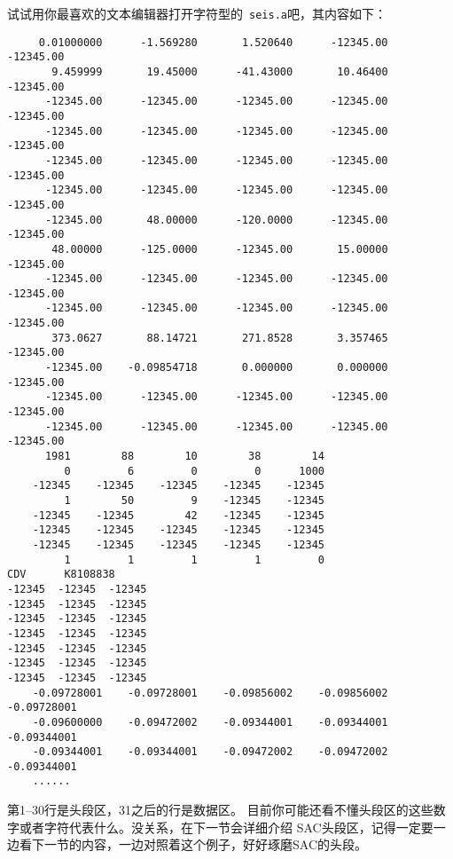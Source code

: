 试试用你最喜欢的文本编辑器打开字符型的~\verb+seis.a+吧，其内容如下：
\begin{verbatim}
     0.01000000      -1.569280       1.520640      -12345.00      -12345.00
       9.459999       19.45000      -41.43000       10.46400      -12345.00
      -12345.00      -12345.00      -12345.00      -12345.00      -12345.00
      -12345.00      -12345.00      -12345.00      -12345.00      -12345.00
      -12345.00      -12345.00      -12345.00      -12345.00      -12345.00
      -12345.00      -12345.00      -12345.00      -12345.00      -12345.00
      -12345.00       48.00000      -120.0000      -12345.00      -12345.00
       48.00000      -125.0000      -12345.00       15.00000      -12345.00
      -12345.00      -12345.00      -12345.00      -12345.00      -12345.00
      -12345.00      -12345.00      -12345.00      -12345.00      -12345.00
       373.0627       88.14721       271.8528       3.357465      -12345.00
      -12345.00    -0.09854718       0.000000       0.000000      -12345.00
      -12345.00      -12345.00      -12345.00      -12345.00      -12345.00
      -12345.00      -12345.00      -12345.00      -12345.00      -12345.00
      1981        88        10        38        14
         0         6         0         0      1000
    -12345    -12345    -12345    -12345    -12345
         1        50         9    -12345    -12345
    -12345    -12345        42    -12345    -12345
    -12345    -12345    -12345    -12345    -12345
    -12345    -12345    -12345    -12345    -12345
         1         1         1         1         0
CDV      K8108838
-12345  -12345  -12345
-12345  -12345  -12345
-12345  -12345  -12345
-12345  -12345  -12345
-12345  -12345  -12345
-12345  -12345  -12345
-12345  -12345  -12345
    -0.09728001    -0.09728001    -0.09856002    -0.09856002    -0.09728001
    -0.09600000    -0.09472002    -0.09344001    -0.09344001    -0.09344001
    -0.09344001    -0.09344001    -0.09472002    -0.09472002    -0.09344001
    ......
\end{verbatim}

第1--30行是头段区，31之后的行是数据区。
目前你可能还看不懂头段区的这些数字或者字符代表什么。没关系，在下一节会详细介绍
SAC头段区，记得一定要一边看下一节的内容，一边对照着这个例子，好好琢磨SAC的头段。

